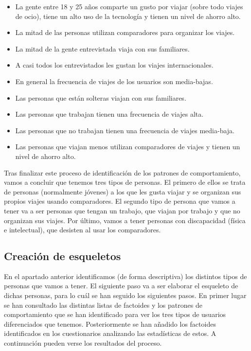 \begin{itemize}
    \item La gente entre 18 y 25 años comparte un gusto por viajar (sobre todo viajes de ocio), tiene un alto uso de la tecnología y tienen un nivel de ahorro alto.
    \item La mitad de las personas utilizan comparadores para organizar los viajes.
    \item La mitad de la gente entrevistada viaja con sus familiares.
    \item A casi todos los entrevistados les gustan los viajes internacionales.
    \item En general la frecuencia de viajes de los usuarios son media-bajas.
    \item Las personas que están solteras viajan con sus familiares.
    \item Las personas que trabajan tienen una frecuencia de viajes alta.
    \item Las personas que no trabajan tienen una frecuencia de viajes media-baja.
    \item Las personas que viajan menos utilizan comparadores de viajes y tienen un nivel de ahorro alto.
    
\end{itemize}

Tras finalizar este proceso de identificación de los patrones de comportamiento, vamos a concluir que tenemos tres tipos de personas. El primero de ellos se trata de personas (normalmente jóvenes) a los que les gusta viajar y se organizan sus propios viajes usando comparadores. El segundo tipo de persona que vamos a tener va a ser personas que tengan un trabajo, que viajan por trabajo y que no organizan sus viajes. Por último, vamos a tener personas con discapacidad (física e intelectual), que desisten al usar los comparadores.

\subsection{Creación de esqueletos}
En el apartado anterior identificamos (de forma descriptiva) los distintos tipos de personas que vamos a tener. El siguiente paso va a ser elaborar el esqueleto de dichas personas, para lo cuál se han seguido los siguientes pasos. En primer lugar se han consultado las distintas listas de factoides y los patrones de comportamiento que se han identificado para ver los tres tipos de usuarios diferenciados que tenemos. Posteriormente se han añadido los factoides identificados en los cuestionarios analizando las estadísticas de estos. A continuación pueden verse los resultados del proceso. \\

